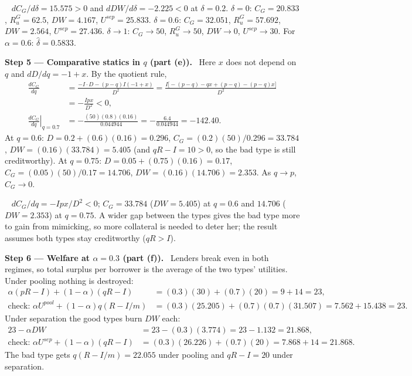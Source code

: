 \documentclass[11pt,a4paper]{article}
\newcommand{\step}[2]{\par\medskip\noindent\textbf{Step #1 --- #2.}~}
\newcommand{\answer}[1]{\par\smallskip\noindent\fbox{\textbf{Answer #1.}}~}
\begin{document}
\answer{(d)} $dC_G/d\delta=15.575>0$ and $dDW/d\delta=-2.225<0$ at $\delta=0.2$. $\delta=0$: $C_G=20.833$, $R_u^G=62.5$, $DW=4.167$, $U^{sep}=25.833$. $\delta=0.6$: $C_G=32.051$, $R_u^G=57.692$, $DW=2.564$, $U^{sep}=27.436$. $\delta\to1$: $C_G\to50$, $R_u^G\to50$, $DW\to0$, $U^{sep}\to30$. For $\alpha=0.6$: $\hat\delta=0.5833$.

\step{5}{Comparative statics in $q$ (part (e))} Here $x$ does not depend on $q$ and $dD/dq=-1+x$. By the quotient rule,
\begin{align}
  \frac{dC_G}{dq} &= \frac{-I\cdot D-(p-q)I(-1+x)}{D^2} = \frac{I\bigl[-(p-q)-qx+(p-q)-(p-q)x\bigr]}{D^2} \nonumber\\
  &= -\frac{Ipx}{D^2} < 0, \nonumber\\
  \left.\frac{dC_G}{dq}\right|_{q=0.7} &= -\frac{(50)(0.8)(0.16)}{0.044944} = -\frac{6.4}{0.044944} = -142.40. \nonumber
\end{align}
At $q=0.6$: $D=0.2+(0.6)(0.16)=0.296$, $C_G=(0.2)(50)/0.296=33.784$, $DW=(0.16)(33.784)=5.405$ (and $qR-I=10>0$, so the bad type is still creditworthy). At $q=0.75$: $D=0.05+(0.75)(0.16)=0.17$, $C_G=(0.05)(50)/0.17=14.706$, $DW=(0.16)(14.706)=2.353$. As $q\to p$, $C_G\to0$.

\answer{(e)} $dC_G/dq=-Ipx/D^2<0$; $C_G=33.784$ ($DW=5.405$) at $q=0.6$ and $14.706$ ($DW=2.353$) at $q=0.75$. A wider gap between the types gives the bad type more to gain from mimicking, so more collateral is needed to deter her; the result assumes both types stay creditworthy ($qR>I$).

\step{6}{Welfare at $\alpha=0.3$ (part (f))} Lenders break even in both regimes, so total surplus per borrower is the average of the two types' utilities. Under pooling nothing is destroyed:
\begin{align}
  \alpha(pR-I)+(1-\alpha)(qR-I) &= (0.3)(30)+(0.7)(20) = 9+14 = 23, \nonumber\\
  \text{check: } \alpha U^{pool}+(1-\alpha)q(R-I/m) &= (0.3)(25.205)+(0.7)(0.7)(31.507) = 7.562+15.438 = 23. \nonumber
\end{align}
Under separation the good types burn $DW$ each:
\begin{align}
  23-\alpha DW &= 23-(0.3)(3.774) = 23-1.132 = 21.868, \nonumber\\
  \text{check: } \alpha U^{sep}+(1-\alpha)(qR-I) &= (0.3)(26.226)+(0.7)(20) = 7.868+14 = 21.868. \nonumber
\end{align}
The bad type gets $q(R-I/m)=22.055$ under pooling and $qR-I=20$ under separation.
\end{document}
